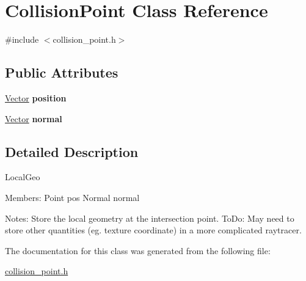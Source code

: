 \hypertarget{class_collision_point}{}\section{Collision\+Point Class Reference}
\label{class_collision_point}


{\ttfamily \#include $<$collision\+\_\+point.\+h$>$}

\subsection*{Public Attributes}
\begin{DoxyCompactItemize}
\item 
\mbox{\label{class_collision_point_a2b292b11745c34cc5ff66eaeafcd27c9}} 
\mbox{\hyperlink{struct_vector}{Vector}} {\bfseries position}
\item 
\mbox{\label{class_collision_point_aa842faabd72a514514cb619925cff3cf}} 
\mbox{\hyperlink{struct_vector}{Vector}} {\bfseries normal}
\end{DoxyCompactItemize}


\subsection{Detailed Description}
Local\+Geo

Members\+: Point pos Normal normal

Notes\+: Store the local geometry at the intersection point. To\+Do\+: May need to store other quantities (eg. texture coordinate) in a more complicated raytracer. 

The documentation for this class was generated from the following file\+:\begin{DoxyCompactItemize}
\item 
\mbox{\hyperlink{collision__point_8h}{collision\+\_\+point.\+h}}\end{DoxyCompactItemize}
